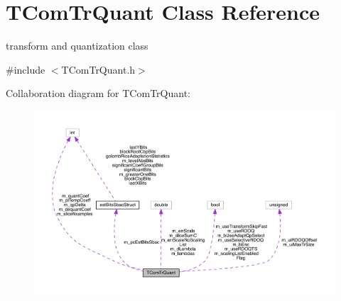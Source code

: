 \hypertarget{class_t_com_tr_quant}{}\section{T\+Com\+Tr\+Quant Class Reference}
\label{class_t_com_tr_quant}


transform and quantization class  




{\ttfamily \#include $<$T\+Com\+Tr\+Quant.\+h$>$}



Collaboration diagram for T\+Com\+Tr\+Quant\+:
\nopagebreak
\begin{figure}[H]
\begin{center}
\leavevmode
\includegraphics[width=350pt]{d3/dea/class_t_com_tr_quant__coll__graph}
\end{center}
\end{figure}
